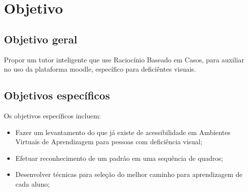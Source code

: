 \section{Objetivo}
\subsection{Objetivo geral}
Propor um tutor inteligente que use Raciocínio Baseado em Casos, para auxiliar no uso da plataforma moodle, específico para
deficiêntes visuais.

\subsection{Objetivos específicos}
Os objetivos específicos incluem:
\begin{itemize}
\item Fazer um levantamento do que já existe de acessibilidade em Ambientes Virtuais de Aprendizagem para pessoas com deficiência visual;
\item Efetuar reconhecimento de um padrão em uma sequência de quadros; 
\item Desenvolver técnicas para seleção do melhor caminho para aprendizagem de cada aluno;
\end{itemize}
